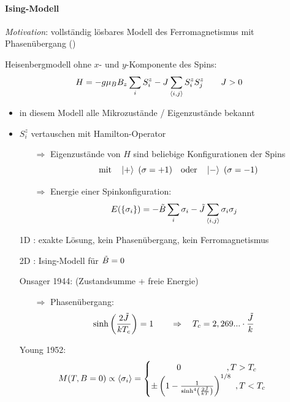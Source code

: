 \paragraph{Ising-Modell}
\begin{center}
\emph{Motivation}: vollständig lösbares Modell des Ferromagnetismus mit Phasenübergang ()
\end{center}
Heisenbergmodell ohne $x$- und $y$-Komponente des Spins:
\begin{equation}
    H = -g\mu_B B_z \sum_i S_i^z - J \sum_{\expval{i,j}} S_i^z S_j^z \qquad J > 0
\end{equation}
\begin{itemize}
    \item in diesem Modell alle Mikrozustände / Eigenzustände bekannt
    \item $S_i^z$ vertauschen mit Hamilton-Operator
    \begin{itemize}
        \item[$\Rightarrow$] Eigenzustände von $H$ sind beliebige Konfigurationen der Spins
        \begin{equation}
            \qq{mit} \ket{+} \ (\sigma = +1) \qq{oder} \ket{-} \ (\sigma = -1)
        \end{equation}
        \item[$\Rightarrow$] Energie einer Spinkonfiguration:
        \begin{equation}
            E(\{\sigma_i\}) = - \Tilde{B} \sum_i \sigma_i - \Tilde{J} \sum_{\expval{i,j}} \sigma_i\sigma_j
        \end{equation}
    \end{itemize}
    \item[1D]: exakte Lösung, kein Phasenübergang, kein Ferromagnetismus
    \item[2D]: Ising-Modell für $\Tilde{B}=0$
    \item[] Onsager 1944: (Zustandsumme + freie Energie)
    \begin{itemize}
        \item[$\Rightarrow$] Phasenübergang:
        \begin{equation}
            \sinh\left(\frac{2\Tilde{J}}{kT_c}\right) = 1 \qquad \Rightarrow \quad T_c = 2,269...\cdot \frac{\Tilde{J}}{k}
        \end{equation}
    \end{itemize}
    \item[] Young 1952:
    \begin{equation}
        M(T,B=0) \propto \expval{\sigma_i} = \begin{cases}
            \qquad \qq{0}\qquad \qq{      }, T>T_c\\
            \pm \left(1-\frac{1}{\sinh^4\left(\frac{2\Tilde{J}}{kT}\right)}\right)^{1/8} \ , T<T_c
        \end{cases}
    \end{equation}
\end{itemize}

